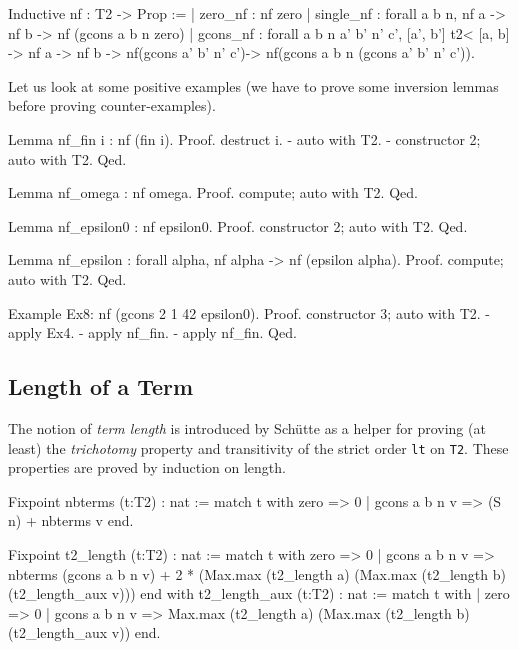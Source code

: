 {\begin{Coqsrc}
Inductive nf : T2 -> Prop :=
| zero_nf : nf zero
| single_nf : forall a b n, nf a ->  nf b -> nf (gcons a b n zero)
| gcons_nf : forall a b n a' b' n' c', 
                      [a', b'] t2< [a, b]  -> 
                      nf a -> nf b -> 
                      nf(gcons a' b' n' c')-> 
                      nf(gcons a b n (gcons a' b' n' c')).
\end{Coqsrc}

Let us look at some positive examples (we have to prove some inversion lemmas before proving counter-examples).


\begin{Coqsrc}
Lemma  nf_fin i : nf (fin i).
Proof.
  destruct i.
  - auto with T2.
  - constructor 2; auto with T2.
Qed.

Lemma nf_omega : nf omega.
Proof.  compute; auto with T2. Qed.

Lemma nf_epsilon0 : nf epsilon0.
Proof. constructor 2; auto with T2. Qed.

Lemma nf_epsilon : forall alpha, nf alpha -> nf (epsilon alpha).
Proof. compute; auto with T2. Qed.

Example Ex8: nf (gcons 2 1 42 epsilon0).
Proof.
  constructor 3; auto with T2.
  - apply Ex4.
  - apply nf_fin.
  - apply nf_fin.
Qed.
\end{Coqsrc}


\subsection{Length of a Term}

The notion of \emph{term length} is introduced by Schütte as a helper for proving (at least) the \emph{trichotomy} property and transitivity of the strict order \texttt{lt} on \texttt{T2}. These properties are proved by induction on length.

\begin{Coqsrc}
Fixpoint nbterms (t:T2) : nat :=
  match t with zero => 0
             | gcons a b n v => (S n) + nbterms v
  end.

Fixpoint t2_length (t:T2) : nat :=
  match t  with 
    zero => 0
  | gcons a b n v => 
       nbterms (gcons a b n v) + 
      2 * (Max.max (t2_length a)
                              (Max.max (t2_length b) 
                                                (t2_length_aux v)))
  end
with t2_length_aux (t:T2) : nat :=
 match t with 
 | zero => 0
  | gcons a b n v =>
           Max.max (t2_length a) 
                            (Max.max (t2_length b) (t2_length_aux v))
 end.
\end{Coqsrc}

}
